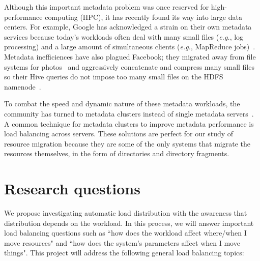 Although this important metadata problem was once reserved for high-performance
computing (HPC), it has recently found its way into large data centers. For
example, Google has acknowledged a strain on their own metadata services
because today's workloads often deal with many small files ({\it e.g.}, log
processing) and a large amount of simultaneous clients ({\it e.g.}, MapReduce
jobs)~\cite{mckusick:acm2010-gfs-evolution}. Metadata inefficiences have also
plagued Facebook; they migrated away from file systems for
photos~\cite{beaver:osdi2010-haystack} and aggressively concatenate and
compress many small files so their Hive queries do not impose too many small
files on the HDFS namenode~\cite{thusoo:sigmod2010-facebook-infrastructure}. 


To combat the speed and dynamic nature of these metadata workloads, the
community has turned to metadata clusters instead of single metadata
servers~\cite{patil:fast2011-giga+,weil:osdi2006-ceph,weil:sc2004-dyn-metadata,sinnamohideen:atc2010-ursa,xing:sc2009-skyfs}.
A common technique for metadata clusters to improve metadata performance is
load balancing across servers. These solutions are perfect for our study of
resource migration because they are some of the only systems that migrate the
resources themselves, in the form of directories and directory fragments. 


\section{Research questions}
We propose investigating automatic load distribution with the awareness that distribution depends on the workload. In this process, we will answer important load balancing questions such as ``how does the workload affect where/when I move resources" and ``how does the system's parameters affect when I move things". This project will address the following general load balancing topics:

